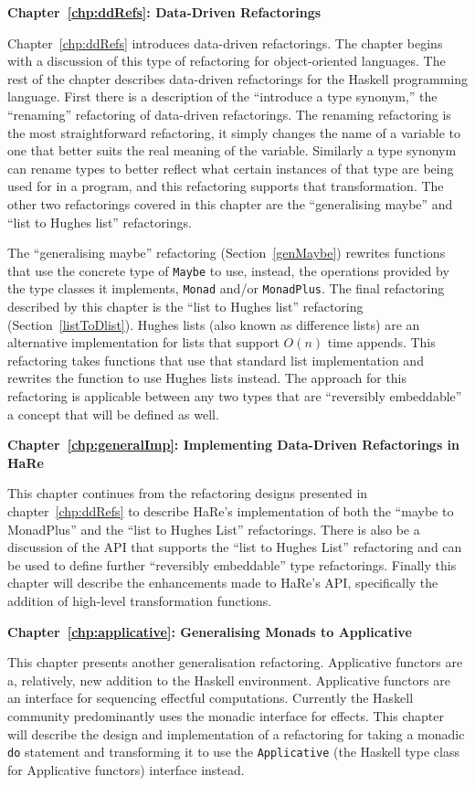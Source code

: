 \textbf{Chapter~\ref{chp:ddRefs}: Data-Driven Refactorings}

Chapter~\ref{chp:ddRefs} introduces data-driven refactorings. The chapter begins with a discussion of this type of refactoring for object-oriented languages. The rest of the chapter describes data-driven refactorings for the Haskell programming language. First there is a description of the ``introduce a type synonym,'' the ``renaming'' refactoring of data-driven refactorings. The renaming refactoring is the most straightforward refactoring, it simply changes the name of a variable to one that better suits the real meaning of the variable. Similarly a type synonym can rename types to better reflect what certain instances of that type are being used for in a program, and this refactoring supports that transformation. The other two refactorings covered in this chapter are the ``generalising maybe'' and ``list to Hughes list'' refactorings.

The ``generalising maybe'' refactoring (Section~\ref{genMaybe}) rewrites functions that use the concrete type of \texttt{Maybe} to use, instead, the operations provided by the type classes it implements, \texttt{Monad} and/or \texttt{MonadPlus}. The final refactoring described by this chapter is the ``list to Hughes list'' refactoring (Section~\ref{listToDlist}). Hughes lists (also known as difference lists) are an alternative implementation for lists that support $O(n)$ time appends. This refactoring takes functions that use that standard list implementation and rewrites the function to use Hughes lists instead. The approach for this refactoring is applicable between any two types that are ``reversibly embeddable'' a concept that will be defined as well.

\textbf{Chapter~\ref{chp:generalImp}: Implementing Data-Driven Refactorings in HaRe}

This chapter continues from the refactoring designs presented in chapter~\ref{chp:ddRefs} to describe HaRe's implementation of both the ``maybe to MonadPlus'' and the ``list to Hughes List'' refactorings. There is also be a discussion of the API that  supports the ``list to Hughes List'' refactoring and can be used to define further ``reversibly embeddable'' type refactorings. Finally this chapter will describe the enhancements made to HaRe's API, specifically the addition of high-level transformation functions.

\textbf{Chapter~\ref{chp:applicative}: Generalising Monads to Applicative}

This chapter presents another generalisation refactoring. Applicative functors are a, relatively, new addition to the Haskell environment. Applicative functors are an interface for sequencing effectful computations. Currently the Haskell community predominantly uses the monadic interface for effects. This chapter will describe the design and implementation of a refactoring for taking a monadic \texttt{do} statement and transforming it to use the \texttt{Applicative} (the Haskell type class for Applicative functors) interface instead.

